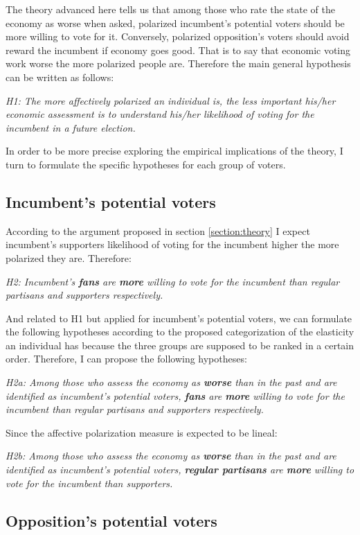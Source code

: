 \documentclass[a4paper, svgnames]{article}
\begin{document}
The theory advanced here tells us that among those who rate the state of the economy as worse when asked, polarized incumbent's potential voters should be more willing to vote for it. Conversely, polarized opposition's voters should avoid reward the incumbent if economy goes good. That is to say that economic voting work worse the more polarized people are. Therefore the main general hypothesis can be written as follows:

\textit{H1: The more affectively polarized an individual is, the less important his/her economic assessment is to understand his/her likelihood of voting for the incumbent in a future election.}

In order to be more precise exploring the empirical implications of the theory, I turn to formulate the specific hypotheses for each group of voters.

\subsection{Incumbent's potential voters}

According to the argument proposed in section \ref{section:theory} I expect incumbent's supporters likelihood of voting for the incumbent higher the more polarized they are. Therefore:

\textit{H2: Incumbent's \textbf{fans} are \textbf{more} willing to vote for the incumbent than regular partisans and supporters respectively.}

And related to H1 but applied for incumbent's potential voters, we can formulate the following hypotheses according to the proposed categorization of the elasticity an individual has because the three groups are supposed to be ranked in a certain order. Therefore, I can propose the following hypotheses:

\textit{H2a: Among those who assess the economy as \textbf{worse} than in the past and are identified as incumbent's potential voters, \textbf{fans} are \textbf{more} willing to vote for the incumbent than regular partisans and supporters respectively.}

Since the affective polarization measure is expected to be lineal:

\textit{H2b: Among those who assess the economy as \textbf{worse} than in the past and are identified as incumbent's potential voters, \textbf{regular partisans} are \textbf{more} willing to vote for the incumbent than supporters.}

\subsection{Opposition's potential voters}
\end{document}
